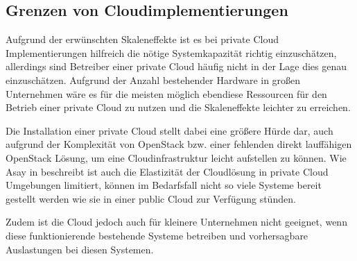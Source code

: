 \subsection{Grenzen von Cloudimplementierungen}
Aufgrund der erwünschten Skaleneffekte ist es bei private Cloud Implementierungen hilfreich die nötige Systemkapazität richtig einzuschätzen, allerdings sind Betreiber einer private Cloud häufig nicht in der Lage dies genau einzuschätzen. Aufgrund der Anzahl bestehender Hardware in großen Unternehmen wäre es für die meisten möglich ebendiese Ressourcen für den Betrieb einer private Cloud zu nutzen und die Skaleneffekte leichter zu erreichen. \cite{privateFail}

Die Installation einer private Cloud stellt dabei eine größere Hürde dar, auch aufgrund der Komplexität von OpenStack  bzw. einer fehlenden direkt lauffähigen OpenStack Lösung, um eine Cloudinfrastruktur leicht aufstellen zu können. Wie Asay in \cite{privateFail} beschreibt ist auch die Elastizität der Cloudlösung in private Cloud Umgebungen limitiert, können im Bedarfsfall nicht so viele Systeme bereit gestellt werden wie sie in einer public Cloud zur Verfügung stünden.

Zudem ist die Cloud jedoch auch für kleinere Unternehmen nicht geeignet, wenn diese funktionierende bestehende Systeme betreiben und vorhersagbare Auslastungen bei diesen Systemen. \cite{privateFail2}